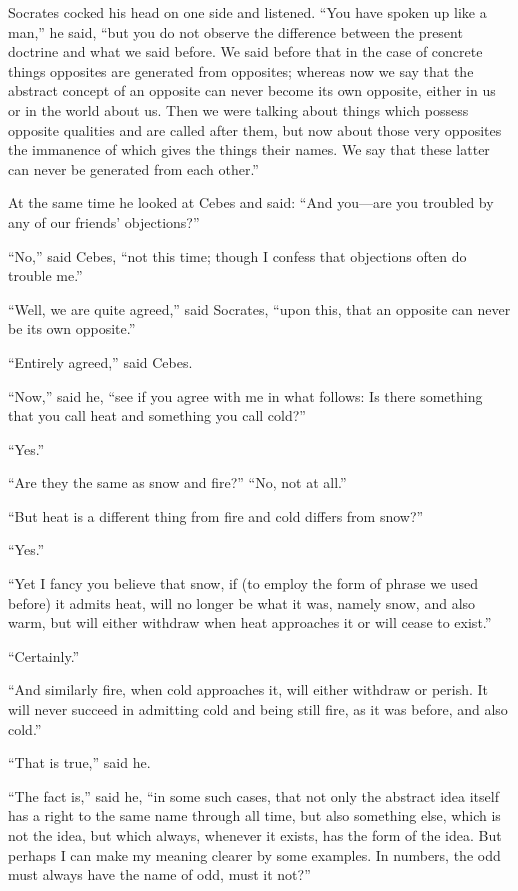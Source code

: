 \documentclass[letterpaper,12pt]{article}
\newcommand{\stephpag}[1]{\marginnote{\small\itshape\fontfamily{ppl}\selectfont #1}}
\begin{document}
\begin{drama}
Socrates cocked his head on one side and listened. \stephpag{b} ``You have spoken up like a man,'' he said, ``but you do not observe the difference between the present doctrine and what we said before. We said before that in the case of concrete things opposites are generated from opposites; whereas now we say that the abstract concept of an opposite can never become its own opposite, either in us or in the world about us. Then we were talking about things which possess opposite qualities and are called after them, but now about those very opposites the immanence of which gives the things their names. We say that these latter \stephpag{c} can never be generated from each other.''
 
At the same time he looked at Cebes and said: ``And you---are you troubled by any of our friends' objections?''
 
``No,'' said Cebes, ``not this time; though I confess that objections often do trouble me.''
 
``Well, we are quite agreed,'' said Socrates, ``upon this, that an opposite can never be its own opposite.''
 
``Entirely agreed,'' said Cebes.
 
``Now,'' said he, ``see if you agree with me in what follows: Is there something that you call heat and something you call cold?''
 
``Yes.''
 
``Are they the same as snow and fire?'' \stephpag{d} ``No, not at all.''
 
``But heat is a different thing from fire and cold differs from snow?''
 
``Yes.''
 
``Yet I fancy you believe that snow, if (to employ the form of phrase we used before) it admits heat, will no longer be what it was, namely snow, and also warm, but will either withdraw when heat approaches it or will cease to exist.''
 
``Certainly.''
 
``And similarly fire, when cold approaches it, will either withdraw or perish. It will never succeed in admitting cold and being still fire, \stephpag{e} as it was before, and also cold.''
 
``That is true,'' said he.
 
``The fact is,'' said he, ``in some such cases, that not only the abstract idea itself has a right to the same name through all time, but also something else, which is not the idea, but which always, whenever it exists, has the form of the idea. But perhaps I can make my meaning clearer by some examples. In numbers, the odd must always have the name of odd, must it not?''
 

\end{drama}
\end{document}
